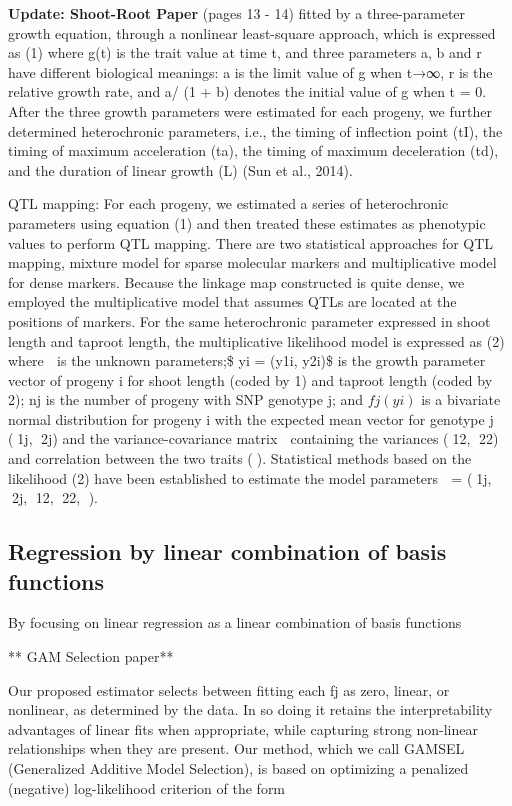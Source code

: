 \documentclass[11pt,]{book}
\theoremstyle{definition}
\theoremstyle{definition}
\theoremstyle{remark}
\begin{document}
\textbf{Update: Shoot-Root Paper} (pages 13 - 14) fitted by a
three-parameter growth equation, through a nonlinear least-square
approach, which is expressed as (1) where g(t) is the trait value at
time t, and three parameters a, b and r have different biological
meanings: a is the limit value of g when t→∞, r is the relative growth
rate, and a/ (1 + b) denotes the initial value of g when t = 0. After
the three growth parameters were estimated for each progeny, we further
determined heterochronic parameters, i.e., the timing of inflection
point (tI), the timing of maximum acceleration (ta), the timing of
maximum deceleration (td), and the duration of linear growth (L) (Sun et
al., 2014).

QTL mapping: For each progeny, we estimated a series of heterochronic
parameters using equation (1) and then treated these estimates as
phenotypic values to perform QTL mapping. There are two statistical
approaches for QTL mapping, mixture model for sparse molecular markers
and multiplicative model for dense markers. Because the linkage map
constructed is quite dense, we employed the multiplicative model that
assumes QTLs are located at the positions of markers. For the same
heterochronic parameter expressed in shoot length and taproot length,
the multiplicative likelihood model is expressed as (2) where  is the
unknown parameters;\$ yi = (y1i, y2i)\$ is the growth parameter vector
of progeny i for shoot length (coded by 1) and taproot length (coded by
2); nj is the number of progeny with SNP genotype j; and \(fj(yi)\) is a
bivariate normal distribution for progeny i with the expected mean
vector for genotype j (1j, 2j) and the variance-covariance matrix 
containing the variances (12, 22) and correlation between the two
traits (). Statistical methods based on the likelihood (2) have been
established to estimate the model parameters  = (1j, 2j, 12, 22,
).

\subsection{Regression by linear combination of basis
functions}\label{regression-by-linear-combination-of-basis-functions}

By focusing on linear regression as a linear combination of basis
functions

** GAM Selection paper**

Our proposed estimator selects between fitting each fj as zero, linear,
or nonlinear, as determined by the data. In so doing it retains the
interpretability advantages of linear fits when appropriate, while
capturing strong non-linear relationships when they are present. Our
method, which we call GAMSEL (Generalized Additive Model Selection), is
based on optimizing a penalized (negative) log-likelihood criterion of
the form
\end{document}
